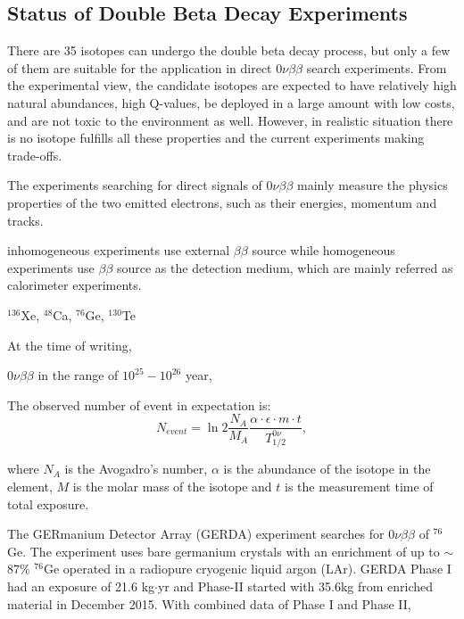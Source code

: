 \subsection{Status of Double Beta Decay Experiments}

There are 35 isotopes can undergo the double beta decay process, but only a few of them are suitable for the application in direct $0\nu\beta\beta$ search experiments\cite{giunti2007fundamentals}. From the experimental view, the candidate isotopes are expected to have relatively high natural abundances, high Q-values, be deployed in a large amount with low costs, and are not toxic to the environment as well. However, in realistic situation there is no isotope fulfills all these properties and the current experiments making trade-offs\cite{dolinski2019neutrinoless}.

The experiments searching for direct signals of $0\nu\beta\beta$ mainly measure the physics properties of the two emitted electrons, such as their energies, momentum and tracks. 

inhomogeneous experiments use external $\beta\beta$ source
while homogeneous experiments use $\beta\beta$ source as the detection medium, which are mainly referred as calorimeter experiments\cite{cremonesi2014challenges,shimizu2019double}.




$^{136}$Xe, $^{48}$Ca, $^{76}$Ge, $^{130}$Te

At the time of writing, 

$0\nu\beta\beta$ in the range of $10^{25}-10^{26}$ year,



The observed number of event in expectation is: 
\[
N_{event} = \ln 2 \frac{N_A}{M_A}\frac{\alpha\cdot\epsilon\cdot m\cdot t}{T^{0\nu}_{1/2}},
\]

where $N_A$ is the Avogadro's number, $\alpha$ is the abundance of the isotope in the element, 
$M$ is the molar mass of the isotope
and $t$ is the measurement time of total exposure.



The GERmanium Detector Array (GERDA) experiment searches for $0\nu\beta\beta$ of $^{76}$Ge. The experiment uses bare germanium crystals with an enrichment of up to $\sim$87\% $^{76}$Ge operated in a radiopure cryogenic liquid argon (LAr)\cite{agostini2016search}. GERDA Phase I had an exposure of 21.6 kg$\cdot$yr and Phase-II started with 35.6kg from enriched material in December 2015. With combined data of Phase I and Phase II, 

